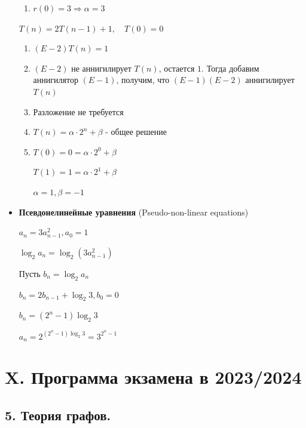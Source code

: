 \documentclass[12pt]{article}
\begin{document}
\begin{itemize}
\begin{enumerate}
            \item $r(0) = 3 \Longrightarrow \alpha = 3$
        \end{enumerate}

        \Ex $T(n) = 2T(n - 1) + 1, \quad T(0) = 0$

        \begin{enumerate}
            \item $(E - 2)T(n) = 1$

            \item $(E - 2)$ не аннигилирует $T(n)$, остается $1$. Тогда добавим аннигилятор $(E - 1)$, получим, что $(E - 1)(E - 2)$ аннигилирует $T(n)$

            \item Разложение не требуется

            \item $T(n) = \alpha \cdot 2^n + \beta$ - общее решение

            \item $T(0) = 0 = \alpha \cdot 2^0 + \beta$

            $T(1) = 1 = \alpha \cdot 2^1 + \beta$

            $\alpha = 1, \beta = -1$
        \end{enumerate}

        \mediumvspace

        \item \textbf{Псевдонелинейные уравнения} (Pseudo-non-linear equations)

        \Ex $a_n = 3a_{n - 1}^2, a_0 = 1$

        $\log_2 a_n = \log_2 (3a_{n - 1}^2)$

        Пусть $b_n = \log_2 a_n$

        $b_n = 2b_{n - 1} + \log_2 3, b_0 = 0$

        $b_n = (2^n - 1)\log_2 3$

        $a_n = 2^{(2^n - 1)\log_2 3} = 3^{2^n - 1}$

    \end{itemize}


    \clearpage


    \section{X. Программа экзамена в 2023/2024}


    \subsection{5. Теория графов.}
\end{document}
